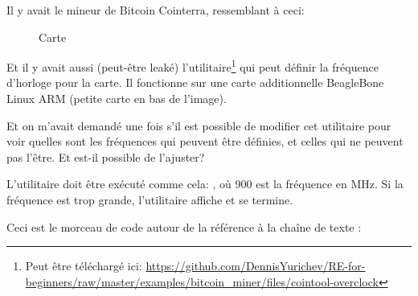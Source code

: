 
Il y avait le mineur de Bitcoin Cointerra, ressemblant à ceci:

\begin{figure}[H]
\centering
{}
\caption{Carte}
\end{figure}

Et il y avait aussi (peut-être leaké) l'utilitaire\footnote{Peut être téléchargé ici: \url{https://github.com/DennisYurichev/RE-for-beginners/raw/master/examples/bitcoin_miner/files/cointool-overclock}}
qui peut définir la fréquence d'horloge pour la carte.
Il fonctionne sur une carte additionnelle BeagleBone Linux ARM (petite carte en bas
de l'image).

Et on m'avait demandé une fois s'il est possible de modifier cet utilitaire pour voir
quelles sont les fréquences qui peuvent être définies, et celles qui ne peuvent pas
l'être.
Et est-il possible de l'ajuster?

L'utilitaire doit être exécuté comme cela: , où 900
est la fréquence en MHz.
Si la fréquence est trop grande, l'utilitaire affiche  et
se termine.

Ceci est le morceau de code autour de la référence à la chaîne de texte :

